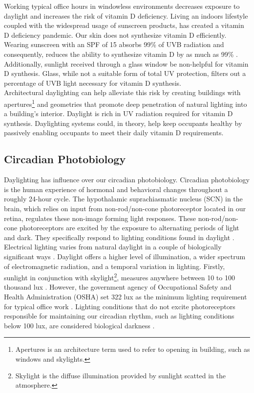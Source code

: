 Working typical office hours in windowless environments decreases exposure to daylight and increases the risk of vitamin D deficiency. Living an indoors lifestyle coupled with the widespread usage of sunscreen products, has created a vitamin D deficiency pandemic.  Our skin does not synthesize vitamin D efficiently. Wearing sunscreen with an SPF of 15 absorbs 99\% of UVB radiation and consequently, reduces the ability to synthesize vitamin D by as much as 99\% \cite{Holick}.  Additionally, sunlight received through a glass window be non-helpful for vitamin D synthesis. Glass, while not a suitable form of total UV protection, filters out a percentage of UVB light \cite{tuchinda2006photoprotection} necessary for vitamin D synthesis. \\

Architectural daylighting can help alleviate this risk by creating buildings with apertures\footnote{Apertures is an architecture term used to refer to opening in building, such as windows and skylights.} and geometries that promote deep penetration of natural lighting into a building's interior. Daylight is rich in UV radiation required for vitamin D synthesis.  Daylighting systems could, in theory, help keep occupants healthy by passively enabling occupants to meet their daily vitamin D requirements. \\

\subsection{Circadian Photobiology}
Daylighting has influence over our circadian photobiology. Circadian photobiology is the human experience of hormonal and behavioral changes throughout a roughly 24-hour cycle. The hypothalamic suprachiasmatic nucleus (SCN)  in the brain, which relies on input from non-rod/non-cone photoreceptor located in our retina, regulates these non-image forming light responses. These non-rod/non-cone photoreceptors are excited by the exposure to alternating periods of light and dark. They specifically respond to lighting conditions found in daylight \cite{Rea,Thapan}.\\

Electrical lighting varies from natural daylight in a couple of biologically significant ways \cite{Rea}. Daylight offers a higher level of illumination, a wider spectrum of electromagnetic radiation, and a temporal variation in lighting. Firstly, sunlight in conjunction with skylight\footnote{Skylight is the diffuse illumination provided by sunlight scatted in the atmosphere.}, measures anywhere between 10 to 100 thousand lux \cite{Robbins}.  However, the government agency of Occupational Safety and Health Administration (OSHA) set 322 lux as the minimum lighting requirement for typical office work \cite{OSHA}. Lighting conditions that do not excite photoreceptors responsible for maintaining our circadian rhythm, such as lighting conditions below 100 lux, are considered biological darkness \cite{Leslie,Rea}. \\

